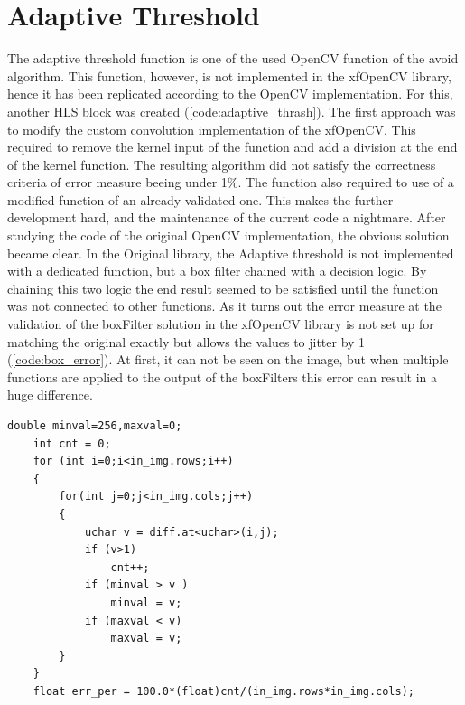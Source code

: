 \section{Adaptive Threshold} %
The adaptive threshold function is one of the used OpenCV function of the avoid algorithm.
This function, however, is not implemented in the xfOpenCV library, hence it has been replicated according to the OpenCV implementation.
For this, another HLS block was created (\cref{code:adaptive_thrash}).
The first approach was to modify the custom convolution implementation of the xfOpenCV.
This required to remove the kernel input of the function and add a division at the end of the kernel function.
The resulting algorithm did not satisfy the correctness criteria of error measure beeing under 1\%.
The function also required to use of a modified function of an already validated one.
This makes the further development hard, and the maintenance of the current code a nightmare.
After studying the code of the original OpenCV implementation, the obvious solution became clear.
In the Original library, the Adaptive threshold is not implemented with a dedicated function, but a box filter chained with a decision logic.
By chaining this two logic the end result seemed to be satisfied until the function was not connected to other functions.
As it turns out the error measure at the validation of the boxFilter solution in the xfOpenCV library is not set up for matching the original exactly but allows the values to jitter by 1 (\cref{code:box_error}).
At first, it can not be seen on the image, but when multiple functions are applied to the output of the boxFilters this error can result in a huge difference.

\begin{lstlisting}
double minval=256,maxval=0;
	int cnt = 0;
	for (int i=0;i<in_img.rows;i++)
	{
		for(int j=0;j<in_img.cols;j++)
		{
			uchar v = diff.at<uchar>(i,j);
			if (v>1)
				cnt++;
			if (minval > v )
				minval = v;
			if (maxval < v)
				maxval = v;
		}
	}
	float err_per = 100.0*(float)cnt/(in_img.rows*in_img.cols);
\end{lstlisting}

